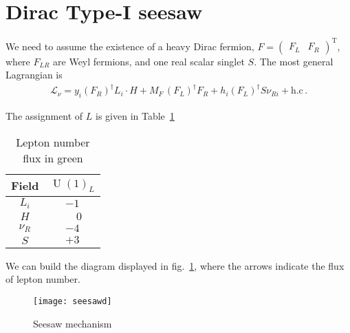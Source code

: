 \section{Dirac Type-I seesaw  }
\begin{frame}
We need to assume the existence of a heavy Dirac fermion, $F=
\begin{pmatrix}
  F_L & F_R
\end{pmatrix}^{\operatorname{T}}$, where $F_{LR}$ are Weyl fermions, and one real scalar singlet $S$. The most general Lagrangian is~\cite{Roncadelli:1983ty}
\begin{align}
  \mathcal{L}_{\nu}=y_i \left(  F_R \right)^{\dagger}L_i\cdot H  
  + M_F\, \left( F_L \right)^{\dagger}  F_R + h_i \left( F_L \right)^{\dagger} S \nu_{Ri}+   \text{h.c}\,.
\end{align}

The assignment of $L$ is given in Table~\ref{tab:Lassignd}
\begin{table}
  \centering
  \begin{tabular}{c|c}
    Field& $\operatorname{U}(1)_L$\\ \hline
    $L_i$& $-1$ \\
    $H$& $\phantom{-}0$ \\
    $\nu_{R}$& $-4$ \\
    $S$&$+3$
  \end{tabular}
  \caption{Lepton number flux in green }
  \label{tab:Lassignd}
\end{table}

We can build the diagram displayed in fig.~\ref{fig:cln}, where the arrows indicate the flux of lepton number. 

\begin{figure}
  \centering
  \texttt{[image: seesawd]}
  \caption{Seesaw mechanism}
  \label{fig:cln}
\end{figure}



\end{frame}
